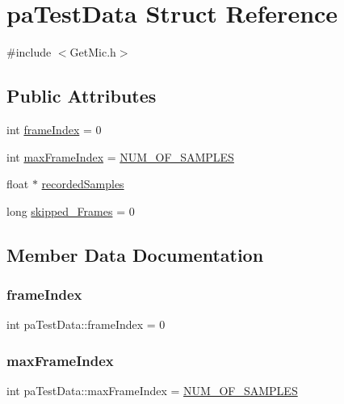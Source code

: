 \hypertarget{structpa_test_data}{}\section{pa\+Test\+Data Struct Reference}
\label{structpa_test_data}


{\ttfamily \#include $<$Get\+Mic.\+h$>$}

\subsection*{Public Attributes}
\begin{DoxyCompactItemize}
\item 
int \hyperlink{structpa_test_data_ab6998ce9ea16a1cbfd92239f9db30091}{frame\+Index} = 0
\item 
int \hyperlink{structpa_test_data_af927cb4284f8d465356704d60690fba5}{max\+Frame\+Index} = \hyperlink{thread_8h_a96ddc6358b6062f82f8bec32b4e6e6b6}{N\+U\+M\+\_\+\+O\+F\+\_\+\+S\+A\+M\+P\+L\+ES}
\item 
float $\ast$ \hyperlink{structpa_test_data_a7d998f00d501e39a7ef025d79d6f918a}{recorded\+Samples}
\item 
long \hyperlink{structpa_test_data_af13ba02098a7902306287407c18ef88f}{skipped\+\_\+\+Frames} = 0
\end{DoxyCompactItemize}


\subsection{Member Data Documentation}
\mbox{\label{structpa_test_data_ab6998ce9ea16a1cbfd92239f9db30091}} 
\subsubsection{\texorpdfstring{frame\+Index}{frameIndex}}
{\footnotesize\ttfamily int pa\+Test\+Data\+::frame\+Index = 0}

\mbox{\label{structpa_test_data_af927cb4284f8d465356704d60690fba5}} 
\subsubsection{\texorpdfstring{max\+Frame\+Index}{maxFrameIndex}}
{\footnotesize\ttfamily int pa\+Test\+Data\+::max\+Frame\+Index = \hyperlink{thread_8h_a96ddc6358b6062f82f8bec32b4e6e6b6}{N\+U\+M\+\_\+\+O\+F\+\_\+\+S\+A\+M\+P\+L\+ES}}

